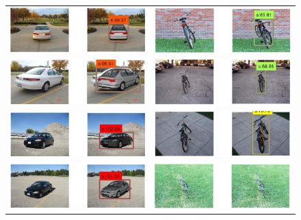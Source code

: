 \documentclass[10pt,twocolumn,letterpaper]{article}
\begin{document}
\begin{figure}[h]
\setlength\tabcolsep{1pt}
\centering
\begin{tabular}{|c|c|}
  \hline
  \includegraphics[width=0.40\linewidth]{supp/car1.png} &
  \includegraphics[width=0.40\linewidth]{supp/bicycle1.png} \\
  \includegraphics[width=0.40\linewidth]{supp/car23.png} &
  \includegraphics[width=0.40\linewidth]{supp/bicycle3.png} \\
  \includegraphics[width=0.40\linewidth]{supp/car26.png} &
  \includegraphics[width=0.40\linewidth]{supp/bicycle4.png} \\
  \includegraphics[width=0.40\linewidth]{supp/car29.png} & 
  \includegraphics[width=0.40\linewidth]{supp/bicycle5.png} \\

\end{tabular}
\end{figure}
\end{document}
